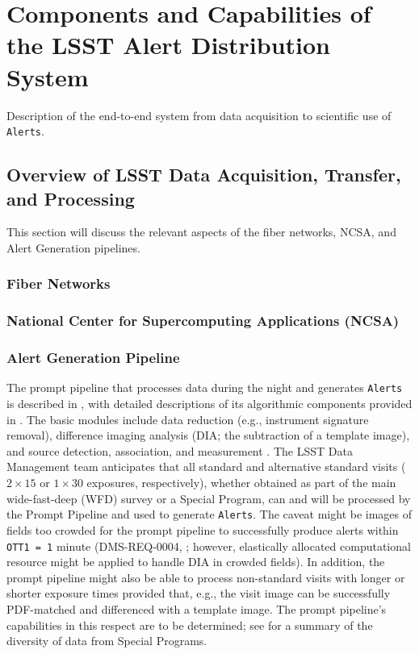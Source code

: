 \section{Components and Capabilities of the LSST Alert Distribution System}\label{sec:components}

Description of the end-to-end system from data acquisition to scientific use of {\tt Alerts}.

\subsection{Overview of LSST Data Acquisition, Transfer, and Processing}

This section will discuss the relevant aspects of the fiber networks, NCSA, and Alert Generation pipelines.

\subsubsection{Fiber Networks}

\subsubsection{National Center for Supercomputing Applications (NCSA)}

\subsubsection{Alert Generation Pipeline}\label{sssec:AGP}

The prompt pipeline that processes data during the night and generates {\tt Alerts} is described in , with detailed descriptions of its algorithmic components provided in .
The basic modules include data reduction (e.g., instrument signature removal), difference imaging analysis (DIA; the subtraction of a template image), and source detection, association, and measurement .
The LSST Data Management team anticipates that all standard and alternative standard visits ($2\times15$ or $1\times30$ exposures, respectively), whether obtained as part of the main wide-fast-deep (WFD) survey or a Special Program, can and will be processed by the Prompt Pipeline and used to generate {\tt Alerts}.
The caveat might be images of fields too crowded for the prompt pipeline to successfully produce alerts within {\tt OTT1 = 1} minute (DMS-REQ-0004, ; however, elastically allocated computational resource might be applied to handle DIA in crowded fields).
In addition, the prompt pipeline might also be able to process non-standard visits with longer or shorter exposure times provided that, e.g., the visit image can be successfully PDF-matched and differenced with a template image.
The prompt pipeline's capabilities in this respect are to be determined; see  for a summary of the diversity of data from Special Programs.

